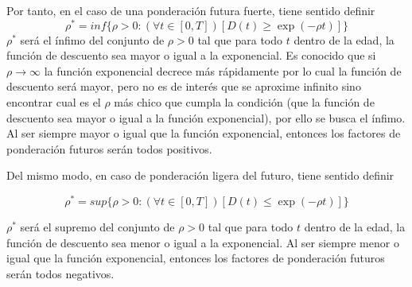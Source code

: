 Por tanto, en el caso de una ponderación futura fuerte, tiene sentido definir
\begin{equation}
\label{eq 4}
    \rho^* = inf \{ \rho > 0 : ( \forall  t \in [0, T])[D(t) \geq \exp(- \rho t)] \}
\end{equation}
$\rho^*$  será el ínfimo del conjunto de $\rho>0$ tal que para todo $t$ dentro de la edad, la función de descuento sea mayor o igual a la exponencial. Es conocido que si $\rho \to \infty$ la función exponencial decrece más rápidamente por lo cual la función de descuento será mayor, pero no es de interés que se aproxime infinito sino encontrar cual es el $\rho$ más chico que cumpla la condición (que la función de descuento sea mayor o igual a la función exponencial), por ello se busca el ínfimo. Al ser siempre mayor o igual que la función exponencial, entonces los factores de ponderación futuros serán todos positivos. 

Del mismo modo, en caso de ponderación ligera del futuro, tiene sentido definir

\begin{equation}
\label{eq 5}
    \rho^* = sup \{ \rho > 0 : ( \forall  t \in [0, T])[D(t) \leq \exp(- \rho t)] \}
\end{equation}

$\rho^*$  será el supremo del conjunto de $\rho>0$ tal que para todo $t$ dentro de la edad, la función de descuento sea menor o igual a la exponencial. Al ser siempre menor o igual que la función exponencial, entonces los factores de ponderación futuros serán todos negativos.

